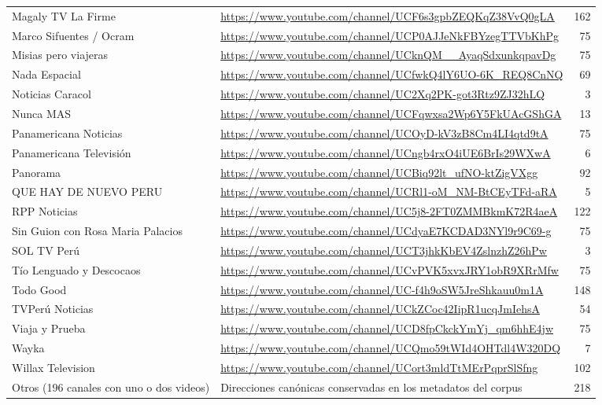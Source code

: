 \begin{longtable}{>{\raggedright\arraybackslash}p{50mm}>{\raggedright\arraybackslash}p{103mm}r}
Magaly TV La Firme & \url{https://www.youtube.com/channel/UCF6s3gpbZEQKqZ38VvQ0gLA} & 162 \\
Marco Sifuentes / Ocram & \url{https://www.youtube.com/channel/UCP0AJJeNkFBYzegTTVbKhPg} & 75 \\
Misias pero viajeras & \url{https://www.youtube.com/channel/UCknQM__AyaqSdxunkqpavDg} & 75 \\
Nada Espacial & \url{https://www.youtube.com/channel/UCfwkQ4lY6UO-6K_REQ8CnNQ} & 69 \\
Noticias Caracol & \url{https://www.youtube.com/channel/UC2Xq2PK-got3Rtz9ZJ32hLQ} & 3 \\
Nunca MAS & \url{https://www.youtube.com/channel/UCFqwxsa2Wp6Y5FkUAcGShGA} & 13 \\
Panamericana Noticias & \url{https://www.youtube.com/channel/UCOyD-kV3zB8Cm4LI4qtd9tA} & 75 \\
Panamericana Televisión & \url{https://www.youtube.com/channel/UCngb4rxO4iUE6BrIs29WXwA} & 6 \\
Panorama & \url{https://www.youtube.com/channel/UCBiq92lt_ufNO-ktZigVXgg} & 92 \\
QUE HAY DE NUEVO PERU & \url{https://www.youtube.com/channel/UCRl1-oM_NM-BtCEyTFd-aRA} & 5 \\
RPP Noticias & \url{https://www.youtube.com/channel/UC5j8-2FT0ZMMBkmK72R4aeA} & 122 \\
Sin Guion con Rosa Maria Palacios & \url{https://www.youtube.com/channel/UCdyaE7KCDAD3NYl9r9C69-g} & 75 \\
SOL TV Perú & \url{https://www.youtube.com/channel/UCT3jhkKbEV4ZslnzhZ26hPw} & 3 \\
Tío Lenguado y Descocaos & \url{https://www.youtube.com/channel/UCvPVK5xvxJRY1obR9XRrMfw} & 75 \\
Todo Good & \url{https://www.youtube.com/channel/UC-f4h9oSW5JreShkauu0m1A} & 148 \\
TVPerú Noticias & \url{https://www.youtube.com/channel/UCkZCoc42IipR1ucqJmIehsA} & 54 \\
Viaja y Prueba & \url{https://www.youtube.com/channel/UCD8fpCkckYmYj_qm6hhE4jw} & 75 \\
Wayka & \url{https://www.youtube.com/channel/UCQmo59tWId4OHTdl4W320DQ} & 7 \\
Willax Television & \url{https://www.youtube.com/channel/UCort3mldTtMErPqprSlSfng} & 102 \\
\midrule
Otros (196 canales con uno o dos videos) & Direcciones canónicas conservadas en los metadatos del corpus & 218 \\
\end{longtable}
